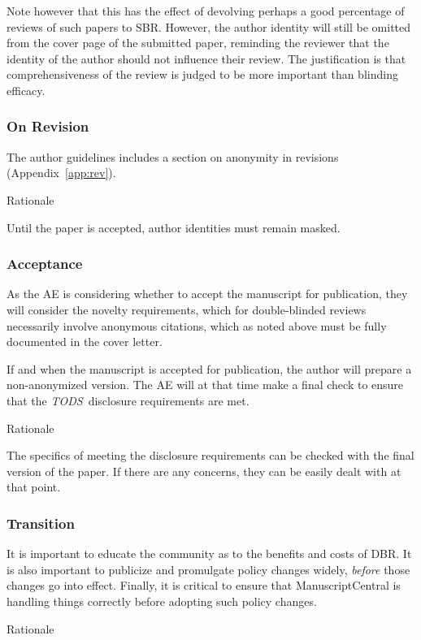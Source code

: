 \documentclass[acmtods,acmnow]{acmtrans2m}
\newcommand{\tods}{{\em TODS\/}}
\begin{document}
Note however that this has the effect of devolving perhaps a good
percentage of reviews of such papers to SBR. However, the
author identity will still be omitted from the cover page of the submitted
paper, reminding the reviewer that the identity of the author should not
influence their review. The justification is that comprehensiveness of the
review is judged to be more important than blinding efficacy.

\subsubsection{On Revision}
The author guidelines includes a section on anonymity in revisions
(Appendix~\ref{app:rev}).

\noindent
{\sffamily Rationale}

Until the paper is accepted, author identities must remain masked.

\subsubsection{Acceptance}
As the AE is considering whether to accept the manuscript for publication,
they will consider the novelty requirements, which for double-blinded
reviews necessarily involve anonymous citations, which as noted above must
be fully documented in the cover letter.

If and when the manuscript is accepted for publication, the author will
prepare a non-anonymized version.
The AE will at that time make a final check to ensure that the \tods\
disclosure requirements are met.

\noindent
{\sffamily Rationale}

The specifics of meeting the disclosure requirements can be checked with the
final version of the paper. If there are any concerns, they can be
easily dealt with at that point.

\subsubsection{Transition}
It is important to educate the community as to the benefits and costs
of DBR. It is also important to publicize and promulgate policy changes
widely, {\em before} those changes go into effect. Finally, it is critical
to ensure that ManuscriptCentral is handling things correctly before
adopting such policy changes.

\noindent
{\sffamily Rationale}
\end{document}
